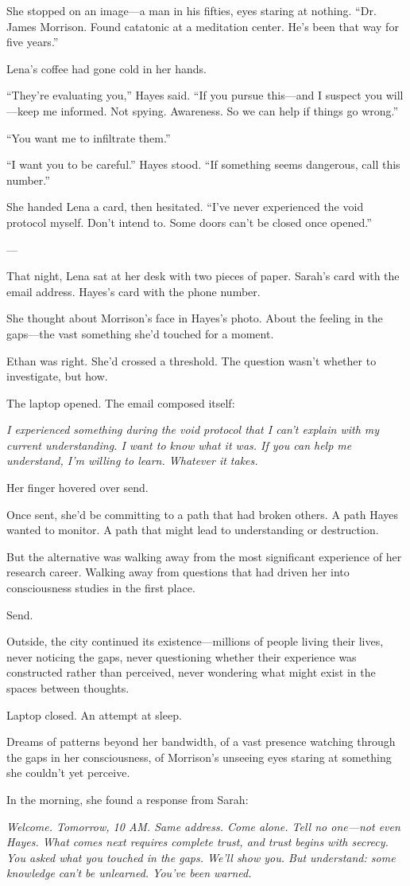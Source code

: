 She stopped on an image---a man in his fifties, eyes staring at nothing. ``Dr. James Morrison. Found catatonic at a meditation center. He's been that way for five years.''

Lena's coffee had gone cold in her hands.

``They're evaluating you,'' Hayes said. ``If you pursue this—and I suspect you will—keep me informed. Not spying. Awareness. So we can help if things go wrong.''

``You want me to infiltrate them.''

``I want you to be careful.'' Hayes stood. ``If something seems dangerous, call this number.''

She handed Lena a card, then hesitated. ``I've never experienced the void protocol myself. Don't intend to. Some doors can't be closed once opened.''

---

That night, Lena sat at her desk with two pieces of paper. Sarah's card with the email address. Hayes's card with the phone number.

She thought about Morrison's face in Hayes's photo. About the feeling in the gaps—the vast something she'd touched for a moment.

Ethan was right. She'd crossed a threshold. The question wasn't whether to investigate, but how.

The laptop opened. The email composed itself:

\textit{I experienced something during the void protocol that I can't explain with my current understanding. I want to know what it was. If you can help me understand, I'm willing to learn. Whatever it takes.}

Her finger hovered over send.

Once sent, she'd be committing to a path that had broken others. A path Hayes wanted to monitor. A path that might lead to understanding or destruction.

But the alternative was walking away from the most significant experience of her research career. Walking away from questions that had driven her into consciousness studies in the first place.

Send.

Outside, the city continued its existence—millions of people living their lives, never noticing the gaps, never questioning whether their experience was constructed rather than perceived, never wondering what might exist in the spaces between thoughts.

Laptop closed. An attempt at sleep.

Dreams of patterns beyond her bandwidth, of a vast presence watching through the gaps in her consciousness, of Morrison's unseeing eyes staring at something she couldn't yet perceive.

In the morning, she found a response from Sarah:

\textit{Welcome. Tomorrow, 10 AM. Same address. Come alone. Tell no one—not even Hayes. What comes next requires complete trust, and trust begins with secrecy. You asked what you touched in the gaps. We'll show you. But understand: some knowledge can't be unlearned. You've been warned.}
